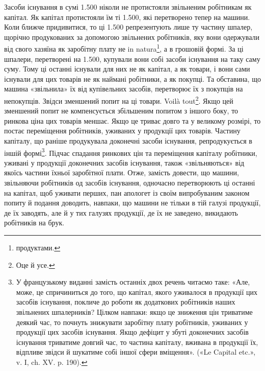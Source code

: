 Засоби існування в сумі \num{1.500} ніколи не протистояли
звільненим робітникам як капітал. Як капітал протистояли
їм ті \num{1.500}, які перетворено тепер на
машини. Коли ближче придивитися, то ці \num{1.500}
репрезентують лише ту частину шпалер, щорічно продукованих
за допомогою звільнених робітників, яку вони одержували
від свого хазяїна як заробітну плату не in natura\footnote*{
продуктами. 
}, а в грошовій
формі. За ці шпалери, перетворені на \num{1.500},
купували вони собі засоби існування на таку саму суму. Тому ці
останні існували для них не як капітал, а як товари, і вони сами
існували для цих товарів не як наймані робітники, а як покупці.
Та обставина, що машина «звільнила» їх від купівельних засобів,
перетворює їх з покупців на непокупців. Звідси зменшений
попит на ці товари. Voilà tout\footnote*{
Оце й усе. 
}. Якщо цей зменшений попит не
компенсується збільшеним попитом з іншого боку, то ринкова
ціна цих товарів меншає. Якщо це триває довго та у великому
розмірі, то постає переміщення робітників, уживаних у продукції
цих товарів. Частину капіталу, що раніше продукувала доконечні
засоби існування, репродукується в іншій формі\footnote*{
У французькому виданні замість останніх двох речень читаємо
таке: «Але, може, це спричиниться до того, що капітал, якого уживалося
в продукції цих засобів існування, покличе до роботи як додаткових
робітників наших звільнених шпалерників? Цілком навпаки: якщо це
зниження цін триватиме деякий час, то почнуть знижувати заробітну плату
робітників, уживаних у продукції цих засобів існування. Якщо дефіцит
у збуті доконечних засобів існування триватиме довгий час, то частина
капіталу, вживана в продукції їх, відпливе звідси й шукатиме собі іншої
сфери вміщення». («Le Capital etc.», v. I, ch. XV. p. 190). 
}. Підчас спадання
ринкових цін та переміщення капіталу робітники, уживані
у продукції доконечних засобів існування, також «звільняються»
від якоїсь частини їхньої заробітної плати. Отже, замість
довести, що машини, звільняючи робітників од засобів існування,
одночасно перетворюють ці останні на капітал, щоб уживати
перших, пан апологет із своїм випробуваним законом попиту й
подання доводить, навпаки, що машини не тільки в тій галузі
продукції, де їх заводять, але й у тих галузях продукції, де їх
не заведено, викидають робітників на брук.

